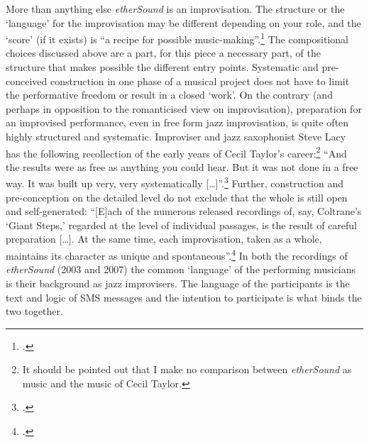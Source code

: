More than anything else \emph{etherSound} is an improvisation. The structure or the `language' for the improvisation may be different depending on your role, and the `score' (if it exists) is ``a recipe for possible music-making''.\footcite[Evan Parker, as cited in][81]{bailey92} The compositional choices discussed above are a part, for this piece a necessary part, of the structure that makes possible the different entry points. Systematic and pre-conceived construction in one phase of a musical project does not have to limit the performative freedom or result in a closed `work'. On the contrary (and perhaps in opposition to the romanticised view on improvisation), preparation for an improvised performance, even in free form jazz improvisation, is quite often highly structured and systematic. Improviser and jazz saxophonist Steve Lacy has the following recollection of the early years of Cecil Taylor's career:\footnote{It should be pointed out that I make no comparison between \emph{etherSound} as music and the music of Cecil Taylor.} ``And the results were as free as anything you could hear. But it was not done in a free way. It was built up very, very systematically [\ldots]''.\footcite[Cited in][81]{bailey92} Further, construction and pre-conception on the detailed level do not exclude that the whole is still open and self-generated: ``[E]ach of the numerous released recordings of, say, Coltrane's `Giant Steps,' regarded at the level of individual passages, is the result of careful preparation [\ldots]. At the same time, each improvisation, taken as a whole, maintains its character as unique and spontaneous''.\footcite[108]{lewis-1} In both the recordings of \emph{etherSound} (2003 and 2007) the common `language' of the performing musicians is their background as jazz improvisers.
The language of the participants is the text and logic of SMS messages and the intention to participate is what binds the two together. 

